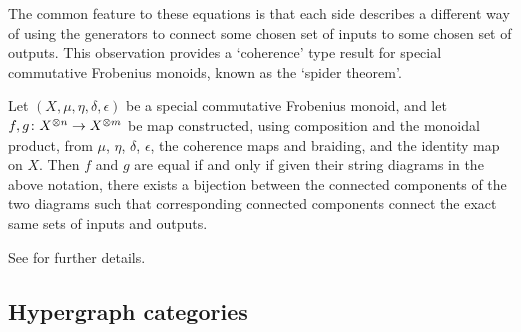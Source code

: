 The common feature to these equations is that each side describes a different
way of using the generators to connect some chosen set of inputs to some chosen
set of outputs. This observation provides a `coherence' type result for special
commutative Frobenius monoids, known as the `spider theorem'.
\begin{theorem}
  Let $(X,\mu,\eta,\delta,\epsilon)$ be a special commutative Frobenius monoid,
  and let $f,g{\colon} X^{\otimes n} \to X^{\otimes m}$ be map constructed, using
  composition and the monoidal product, from $\mu$, $\eta$, $\delta$, $\epsilon$, the
  coherence maps and braiding, and the identity map on $X$. Then $f$ and $g$ are
  equal if and only if given their string diagrams in the above notation, there
  exists a bijection between the connected components of the two diagrams such
  that corresponding connected components connect the exact same sets of inputs
  and outputs.
\end{theorem}%
See \cite{Kis16,FonCoy16} \cite{CK,CPP} for further details.

\subsection{Hypergraph categories}

